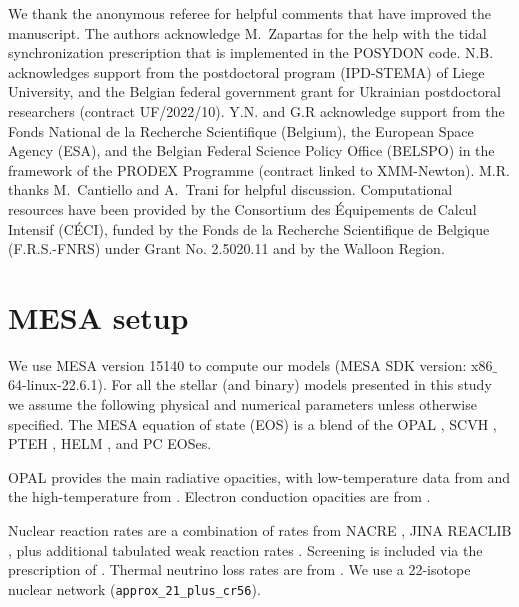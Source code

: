 \documentclass{aa}
\begin{document}
\begin{acknowledgements}
We thank the anonymous referee for helpful comments that
have improved the manuscript. The authors acknowledge M.~Zapartas for the help with the tidal synchronization prescription that is implemented in the POSYDON code.
N.B. acknowledges support from the postdoctoral program (IPD-STEMA) of
Liege University, and the Belgian federal government grant for Ukrainian
postdoctoral researchers (contract UF/2022/10). Y.N. and G.R acknowledge support from the Fonds
National de la Recherche Scientifique (Belgium), the European Space
Agency (ESA), and the Belgian Federal Science Policy Office (BELSPO)
in the framework of the PRODEX Programme (contract linked to
XMM-Newton). M.R. thanks M.~Cantiello and A.~Trani for helpful discussion.
Computational resources have been provided by the Consortium des Équipements de Calcul Intensif (CÉCI), funded by the Fonds de la Recherche Scientifique de Belgique (F.R.S.-FNRS) under Grant No. 2.5020.11 and by the Walloon Region.
\end{acknowledgements}

\appendix


\section{MESA setup}
\label{sec:MESA_setup}


We use MESA version 15140 to compute our models (MESA SDK version: x86$\_$64-linux-22.6.1). For all the stellar (and binary) models presented in
this study we assume the following physical and numerical parameters
unless otherwise specified. The MESA equation of
state (EOS) is a blend of the OPAL \citet{Rogers2002}, SCVH
\citet{Saumon1995}, PTEH \citet{Pols1995}, HELM \citet{Timmes2000},
and PC \citet{Potekhin2010} EOSes.

OPAL \citep{Iglesias1993, Iglesias1996} provides the main radiative
opacities, with low-temperature data from \citet{Ferguson2005} and the
high-temperature from \citet{Buchler1976}. Electron conduction
opacities are from \citet{Cassisi2007}.

Nuclear reaction rates are a combination of rates from NACRE
\citep{Angulo1999}, JINA REACLIB \citep{Cyburt2010}, plus additional
tabulated weak reaction rates \citet{Fuller1985, Oda1994,
  Langanke2000}. Screening is included via the prescription of
\citet{Chugunov2007}.  Thermal neutrino loss rates are from
\citet{Itoh1996}. We use a
22-isotope nuclear network (\texttt{approx\_21\_plus\_cr56}).
\end{document}
